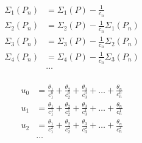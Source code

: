\begin{equation*} \begin{aligned}
\Sigma_1(P_n) &
= \Sigma_1(P)
- \frac{1}{c_n} \\
\Sigma_2(P_n) &
= \Sigma_2(P)
- \frac{1}{c_n} \Sigma_1(P_n) \\
\Sigma_3(P_n) &
= \Sigma_3(P)
- \frac{1}{c_n} \Sigma_2(P_n) \\
\Sigma_4(P_n) &
= \Sigma_4(P)
- \frac{1}{c_n} \Sigma_3(P_n) \\
& \ldots \\
\end{aligned} \end{equation*}

\begin{equation*} \begin{aligned}
u_0 &
= \frac{\theta_1}{c_1^0}
+ \frac{\theta_2}{c_2^0}
+ \frac{\theta_3}{c_3^0}
+ \ldots
+ \frac{\theta_n}{c_n^0} \\
u_1 &
= \frac{\theta_1}{c_1^1}
+ \frac{\theta_2}{c_2^1}
+ \frac{\theta_3}{c_3^1}
+ \ldots
+ \frac{\theta_n}{c_n^1} \\
u_2 &
= \frac{\theta_1}{c_1^2}
+ \frac{\theta_2}{c_2^2}
+ \frac{\theta_3}{c_3^2}
+ \ldots
+ \frac{\theta_n}{c_n^2} \\
& \ldots \\
\end{aligned} \end{equation*}
